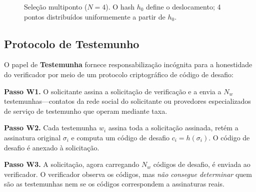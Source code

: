 \documentclass[11pt,a4paper,twocolumn]{article}
\begin{document}
\begin{figure}[ht]
\centering
{}
\caption{Seleção multiponto ($N{=}4$). O hash $h_0$ define o deslocamento; 4 pontos distribuídos uniformemente a partir de $h_0$.}
\label{fig:multipoint}
\end{figure}

\subsection{Protocolo de Testemunho}

O papel de \textbf{Testemunha} fornece responsabilização incógnita para a honestidade do verificador por meio de um protocolo criptográfico de código de desafio:

\textbf{Passo W1.} O solicitante assina a solicitação de verificação e a envia a $N_w$ testemunhas---contatos da rede social do solicitante ou provedores especializados de serviço de testemunho que operam mediante taxa.

\textbf{Passo W2.} Cada testemunha $w_i$ assina toda a solicitação assinada, retém a assinatura original $\sigma_i$ e computa um código de desafio $c_i = h(\sigma_i)$. O código de desafio é anexado à solicitação.

\textbf{Passo W3.} A solicitação, agora carregando $N_w$ códigos de desafio, é enviada ao verificador. O verificador observa os códigos, mas \emph{não consegue determinar} quem são as testemunhas nem se os códigos correspondem a assinaturas reais.
\end{document}
